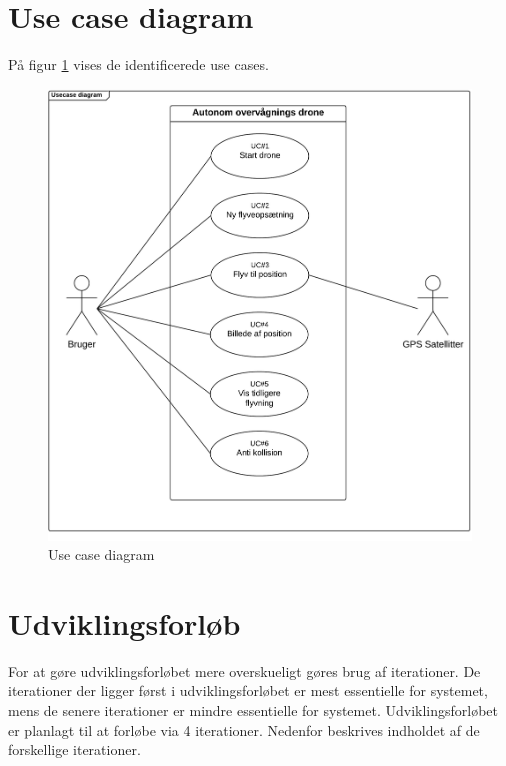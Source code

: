 \newpage 

\section{Use case diagram}
\label{subsec:useCaseDiagram}
På figur \ref{fig:UCD} vises de identificerede use cases.
\vspace{-5pt}
\begin{figure}[H]
\includegraphics[width=1\textwidth]{Billeder/Use_case_diagram.png}
\vspace{-0.8cm}
\caption{Use case diagram}
\label{fig:UCD}
\end{figure}




\newpage
\section{Udviklingsforløb}

For at gøre udviklingsforløbet mere overskueligt gøres brug af iterationer.
De iterationer der ligger først i udviklingsforløbet er mest essentielle for systemet, 
mens de senere iterationer er mindre essentielle for systemet.
Udviklingsforløbet er planlagt til at forløbe via 4 iterationer. Nedenfor beskrives indholdet af de forskellige iterationer. \\

